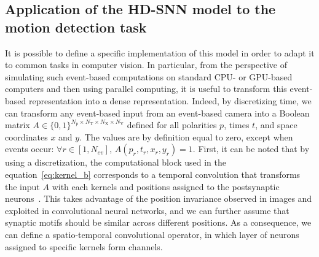\documentclass[default]{sn-jnl}%
\theoremstyle{thmstyleone}%
\theoremstyle{thmstyletwo}%
\theoremstyle{thmstylethree}%
\newcommand{\numevent}{N_{ev}} %
\newcommand{\Npol}{N_\text{p}} %
\newcommand{\arank}{r} %
\newcommand{\polev}{p} %
\newcommand{\Nx}{N_\text{X}}
\newcommand{\Ny}{N_\text{Y}}
\newcommand{\Ntime}{N_\text{T}}
\begin{document}
\subsection{Application of the HD-SNN model to the motion detection task}
%
It is possible to define a specific implementation of this model in order to adapt it to common tasks in computer vision. In particular, from the perspective of simulating such event-based computations on standard CPU- or GPU-based computers and then using parallel computing, it is useful to transform this event-based representation into a dense representation. Indeed, by discretizing time, we can transform any event-based input from an event-based camera into a Boolean matrix $A \in \{0, 1 \}^{\Npol \times \Ntime \times \Nx \times \Ny}$ defined for all polarities $p$, times $t$, and space coordinates $x$ and $y$. The values are by definition equal to zero, except when events occur: $\forall \arank \in [1,\numevent]$, $A(\polev_\arank, t_\arank, x_\arank, y_\arank)=1$. First, it can be noted that by using a discretization, the computational block used in the equation~\eqref{eq:kernel_b} corresponds to a temporal convolution that transforms the input $A$ with each kernels and positions assigned to the postsynaptic neurons~\citep{grimaldi_learning_2022}. This takes advantage of the position invariance observed in images and exploited in convolutional neural networks, and we can further assume that synaptic motifs should be similar across different positions. As a consequence, we can define a spatio-temporal convolutional operator, in which layer of neurons assigned to specific kernels form channels.
\end{document}
